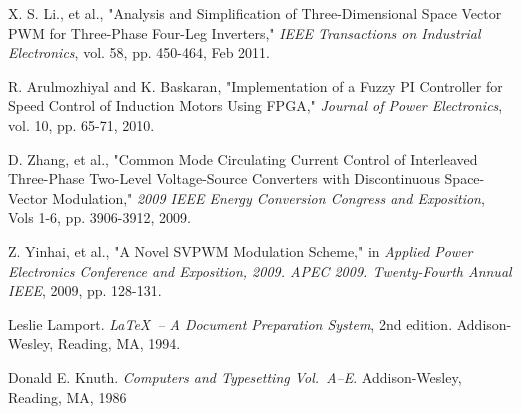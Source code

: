 \documentclass{iaesarticle3}
\begin{document}




%



 \begin{thebibliography}{4}


  X. S. Li., et al., "Analysis and Simplification of Three-Dimensional Space Vector PWM for Three-Phase Four-Leg Inverters," \textsl{IEEE Transactions on Industrial Electronics}, vol. 58, pp. 450-464, Feb 2011.

 	R. Arulmozhiyal and K. Baskaran, "Implementation of a Fuzzy PI Controller for Speed Control of Induction Motors Using FPGA," \textsl{Journal of Power Electronics}, vol. 10, pp. 65-71, 2010.

  D. Zhang, et al., "Common Mode Circulating Current Control of Interleaved Three-Phase Two-Level Voltage-Source Converters with Discontinuous Space-Vector Modulation," \textsl{2009 IEEE Energy Conversion Congress and Exposition}, Vols 1-6, pp. 3906-3912, 2009.

 	Z. Yinhai, et al., "A Novel SVPWM Modulation Scheme," in \textsl{Applied Power Electronics Conference and Exposition, 2009. APEC 2009. Twenty-Fourth Annual IEEE}, 2009, pp. 128-131.
 
  Leslie Lamport. \textsl{\LaTeX\ -- A Document Preparation System}, 2nd edition. Addison-Wesley, Reading, MA, 1994.
 
  Donald E. Knuth. \textsl{Computers and Typesetting Vol.\ A--E}. Addison-Wesley, Reading, MA, 1986

 \end{thebibliography}
\end{document}
